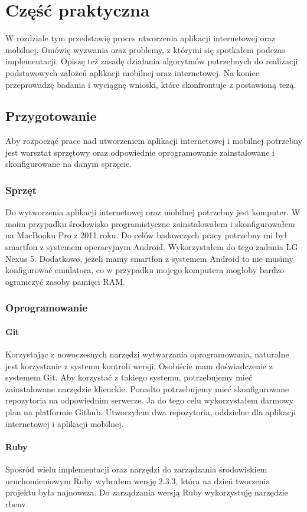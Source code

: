 \chapter{Część praktyczna}
W rozdziale tym przedstawię proces utworzenia aplikacji internetowej oraz mobilnej. Omówię wyzwania oraz problemy, z którymi się spotkałem podczas implementacji. Opiszę też zasadę działania algorytmów potrzebnych do realizacji podstawowych założeń aplikacji mobilnej oraz internetowej. Na koniec przeprowadzę badania i wyciągnę wnioski, które skonfrontuje z postawioną tezą.

\section{Przygotowanie}
Aby rozpocząć prace nad utworzeniem aplikacji internetowej i mobilnej potrzebny jest warsztat sprzętowy oraz odpowiednie oprogramowanie zainstalowane i skonfigurowane na danym sprzęcie.

\subsection{Sprzęt}
Do wytworzenia aplikacji internetowej oraz mobilnej potrzebny jest komputer. W moim przypadku środowisko programistyczne zainstalowałem i skonfigurowałem na MacBooku Pro z 2011 roku. Do celów badawczych pracy potrzebny mi był smartfon z systemem operacyjnym Android. Wykorzystałem do tego zadania LG Nexus 5. Dodatkowo, jeżeli mamy smartfon z systemem Android to nie musimy konfigurować emulatora, co w przypadku mojego komputera mogłoby bardzo ograniczyć zasoby pamięci RAM.

\subsection{Oprogramowanie}
\subsubsection{Git}
Korzystając z nowoczesnych narzędzi wytwarzania oprogramowania, naturalne jest korzystanie z systemu kontroli wersji. Osobiście mam doświadczenie z systemem Git. Aby korzystać z takiego systemu, potrzebujemy mieć zainstalowane narzędzie klienckie. Ponadto potrzebujemy mieć skonfigurowane repozytoria na odpowiednim serwerze. Ja do tego celu wykorzystałem darmowy plan na platformie Github. Utworzyłem dwa repozytoria, oddzielne dla aplikacji internetowej i aplikacji mobilnej.

\subsubsection{Ruby}
Spośród wielu implementacji oraz narzędzi do zarządzania środowiskiem uruchomieniowym Ruby wybrałem wersję 2.3.3, która na dzień tworzenia projektu była najnowsza. Do zarządzania wersją Ruby wykorzystuję narzędzie rbenv.

